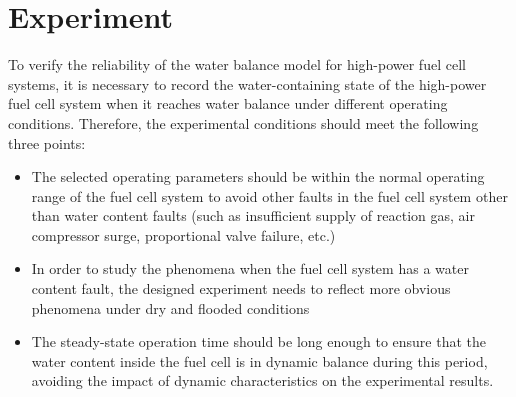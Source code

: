 \section{Experiment}
To verify the reliability of the water balance model for high-power fuel cell systems, it is necessary to record the water-containing state of the high-power fuel cell system when it reaches water balance under different operating conditions. Therefore, the experimental conditions should meet the following three points:
\begin{itemize}
	\item The selected operating parameters should be within the normal operating range of the fuel cell system to avoid other faults in the fuel cell system other than water content faults (such as insufficient supply of reaction gas, air compressor surge, proportional valve failure, etc.)
	\item In order to study the phenomena when the fuel cell system has a water content fault, the designed experiment needs to reflect more obvious phenomena under dry and flooded conditions
	\item The steady-state operation time should be long enough to ensure that the water content inside the fuel cell is in dynamic balance during this period, avoiding the impact of dynamic characteristics on the experimental results.
\end{itemize}
